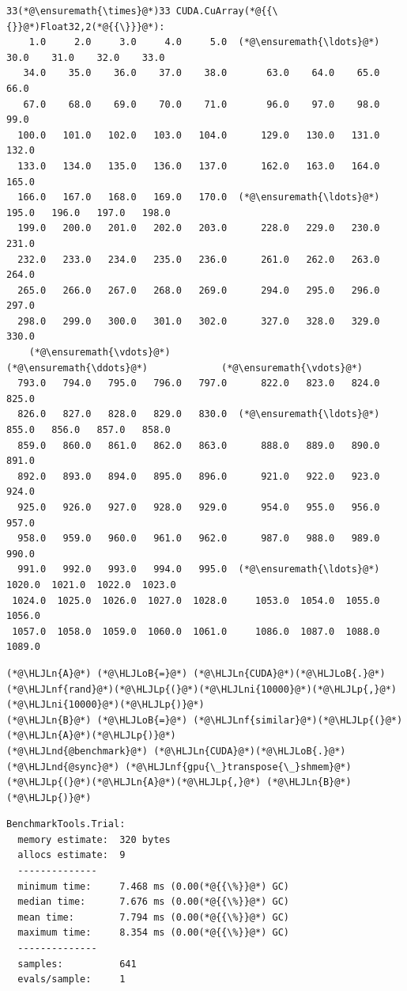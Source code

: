 \documentclass[12pt,a4paper]{article}
\newcommand{\HLJLn}[1]{#1}
\newcommand{\HLJLnd}[1]{\textcolor[RGB]{214,102,97}{#1}}
\newcommand{\HLJLnf}[1]{\textcolor[RGB]{66,102,213}{#1}}
\newcommand{\HLJLni}[1]{\textcolor[RGB]{59,151,46}{#1}}
\newcommand{\HLJLoB}[1]{\textcolor[RGB]{102,102,102}{\textbf{#1}}}
\newcommand{\HLJLp}[1]{#1}
\begin{document}
\begin{lstlisting}
33(*@\ensuremath{\times}@*)33 CUDA.CuArray(*@{{\{}}@*)Float32,2(*@{{\}}}@*):
    1.0     2.0     3.0     4.0     5.0  (*@\ensuremath{\ldots}@*)    30.0    31.0    32.0    33.0
   34.0    35.0    36.0    37.0    38.0       63.0    64.0    65.0    66.0
   67.0    68.0    69.0    70.0    71.0       96.0    97.0    98.0    99.0
  100.0   101.0   102.0   103.0   104.0      129.0   130.0   131.0   132.0
  133.0   134.0   135.0   136.0   137.0      162.0   163.0   164.0   165.0
  166.0   167.0   168.0   169.0   170.0  (*@\ensuremath{\ldots}@*)   195.0   196.0   197.0   198.0
  199.0   200.0   201.0   202.0   203.0      228.0   229.0   230.0   231.0
  232.0   233.0   234.0   235.0   236.0      261.0   262.0   263.0   264.0
  265.0   266.0   267.0   268.0   269.0      294.0   295.0   296.0   297.0
  298.0   299.0   300.0   301.0   302.0      327.0   328.0   329.0   330.0
    (*@\ensuremath{\vdots}@*)                                    (*@\ensuremath{\ddots}@*)             (*@\ensuremath{\vdots}@*)            
  793.0   794.0   795.0   796.0   797.0      822.0   823.0   824.0   825.0
  826.0   827.0   828.0   829.0   830.0  (*@\ensuremath{\ldots}@*)   855.0   856.0   857.0   858.0
  859.0   860.0   861.0   862.0   863.0      888.0   889.0   890.0   891.0
  892.0   893.0   894.0   895.0   896.0      921.0   922.0   923.0   924.0
  925.0   926.0   927.0   928.0   929.0      954.0   955.0   956.0   957.0
  958.0   959.0   960.0   961.0   962.0      987.0   988.0   989.0   990.0
  991.0   992.0   993.0   994.0   995.0  (*@\ensuremath{\ldots}@*)  1020.0  1021.0  1022.0  1023.0
 1024.0  1025.0  1026.0  1027.0  1028.0     1053.0  1054.0  1055.0  1056.0
 1057.0  1058.0  1059.0  1060.0  1061.0     1086.0  1087.0  1088.0  1089.0
\end{lstlisting}


\begin{lstlisting}
(*@\HLJLn{A}@*) (*@\HLJLoB{=}@*) (*@\HLJLn{CUDA}@*)(*@\HLJLoB{.}@*)(*@\HLJLnf{rand}@*)(*@\HLJLp{(}@*)(*@\HLJLni{10000}@*)(*@\HLJLp{,}@*) (*@\HLJLni{10000}@*)(*@\HLJLp{)}@*)
(*@\HLJLn{B}@*) (*@\HLJLoB{=}@*) (*@\HLJLnf{similar}@*)(*@\HLJLp{(}@*)(*@\HLJLn{A}@*)(*@\HLJLp{)}@*)
(*@\HLJLnd{@benchmark}@*) (*@\HLJLn{CUDA}@*)(*@\HLJLoB{.}@*)(*@\HLJLnd{@sync}@*) (*@\HLJLnf{gpu{\_}transpose{\_}shmem}@*)(*@\HLJLp{(}@*)(*@\HLJLn{A}@*)(*@\HLJLp{,}@*) (*@\HLJLn{B}@*)(*@\HLJLp{)}@*)
\end{lstlisting}

\begin{lstlisting}
BenchmarkTools.Trial: 
  memory estimate:  320 bytes
  allocs estimate:  9
  --------------
  minimum time:     7.468 ms (0.00(*@{{\%}}@*) GC)
  median time:      7.676 ms (0.00(*@{{\%}}@*) GC)
  mean time:        7.794 ms (0.00(*@{{\%}}@*) GC)
  maximum time:     8.354 ms (0.00(*@{{\%}}@*) GC)
  --------------
  samples:          641
  evals/sample:     1
\end{lstlisting}
\end{document}
